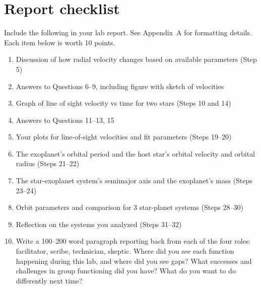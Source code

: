 \section{Report checklist}

Include the following in your lab report. See Appendix~A for formatting details. Each item below is worth 10 points.

\begin{enumerate}
	\item Discussion of how radial velocity changes based on available parameters (Step 5)
	\item Answers to Questions 6--9, including figure with sketch of velocities
	\item Graph of line of sight velocity vs time for two stars (Steps 10 and 14)
	\item Answers to Questions 11--13, 15
	\item Your plots for line-of-sight velocities and fit parameters (Steps 19--20)
	\item The exoplanet's orbital period and the host star's orbital velocity and orbital radius (Steps 21--22)
	\item The star-exoplanet system's semimajor axis and the exoplanet's mass (Steps 23--24)
	\item Orbit parameters and comparison for 3 star-planet systems (Steps 28--30)
	\item Reflection on the systems you analyzed (Steps 31--32)
	\item Write a 100--200 word paragraph reporting back from each of the four roles: facilitator, scribe, technician, skeptic. Where did you see each function happening during this lab, and where did you see gaps? What successes and challenges in group functioning did you have? What do you want to do differently next time?
\end{enumerate}
